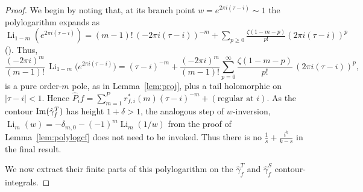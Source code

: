 \documentclass[11pt]{article}
\DeclareMathOperator{\Li}{Li}
\begin{document}
\begin{proof}
We begin by noting that, at %
%
its branch point $w = e^{2 \pi i (\tau-i)} \sim 1$ the polylogarithm expands as
$\Li_{1-m}(e^{2 \pi i (\tau-i)})=(m-1)!\,(-2 \pi i (\tau-i))^{-m}+\sum_{p\ge0}\tfrac{\zeta(1-m-p)}{p!}(2 \pi i (\tau-i))^{p}$
(\cite[\S25.12]{DLMF}). Thus, %
\begin{equation}\label{eq:blockexp}
\frac{(-2\pi i)^m}{(m-1)!}\,\Li_{1-m}\!\big(e^{2\pi i(\tau-i)}\big)
=(\tau-i)^{-m}+\frac{(-2\pi i)^m}{(m-1)!}\sum_{p=0}^{\infty}\frac{\zeta(1-m-p)}{p!}\,(2\pi i(\tau-i))^{p},
\end{equation}
is a pure order-$m$ pole, as in Lemma~\ref{lem:proj}, plus a tail holomorphic on $|\tau-i|<1$. Hence
$\widehat P_i f=\sum_{m=1}^P r^*_{f,i}(m)(\tau-i)^{-m}+(\text{regular at }i)$. 
As the contour ${\rm Im}(\hat\gamma_f^T)$ has height $1+\delta > 1$, the analogous step of 
$w$-inversion, $\Li_m(w)=-\delta_{m,0}-(-1)^m \Li_m(1/w)$ from the proof of Lemma~\ref{lem:polylogcf} 
does not need to be invoked. Thus there is no $\tfrac1s+\tfrac{i^k}{k-s}$ in the final result. 

We now extract their finite parts of this polylogarithm on the $\hat\gamma_f^T$ and $\hat\gamma_f^S$ contour-integrals.



\end{proof}
\end{document}
